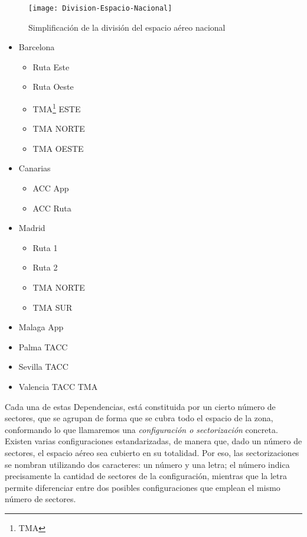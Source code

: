 \begin{figure}
    \centering
    \texttt{[image: Division-Espacio-Nacional]}
    \caption{Simplificación de la división del espacio aéreo nacional}
    \label{fig:2:regiones}
\end{figure}

\begin{itemize}
    \item Barcelona
    \begin{itemize}
        \item Ruta Este
        \item Ruta Oeste
        \item TMA\footnote{\acrlong{TMA}} ESTE
        \item TMA NORTE
        \item TMA OESTE
    \end{itemize}
    \item Canarias
    \begin{itemize}
        \item ACC App
        \item ACC Ruta
    \end{itemize}
    \item Madrid
    \begin{itemize}
        \item Ruta 1
        \item Ruta 2
        \item TMA NORTE
        \item TMA SUR
    \end{itemize}
    \item Malaga App
    \item Palma TACC
    \item Sevilla TACC
    \item Valencia TACC TMA
\end{itemize}

Cada una de estas Dependencias, está constituida por un cierto número de sectores, que se agrupan de forma que se cubra todo el espacio de la zona, conformando lo que llamaremos una \textit{configuración o sectorización} concreta.
Existen varias configuraciones estandarizadas, de manera que, dado un número de sectores, el espacio aéreo sea cubierto en su totalidad.
Por eso, las sectorizaciones se nombran utilizando dos caracteres: un número y una letra; el número indica precisamente la cantidad de sectores de la configuración, mientras que la letra permite diferenciar entre dos posibles 
configuraciones que emplean el mismo número de sectores.
\\

